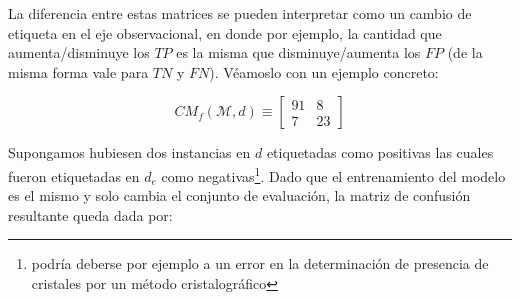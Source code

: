 \iffalse
\[
\begin{array}{ccc}
& & \\
& \text{eje de predicción} &  \\
&
   \begin{bmatrix}
    \lambda_{N,N} (n-n\pi_{P})  + \epsilon_{N,N} & (1-\lambda_{N,N}) (n-n\pi_{P}) + \epsilon_{N,P} \\
    (1-\lambda_{P,P}) n\pi_{P} + \epsilon_{P,N} & \lambda_{P,P} n\pi_{P} + \epsilon_{P,P}
    \end{bmatrix}
    
& \text{eje observacional}
\end{array}
\]
\fi

\iffalse
\[
\begin{array}{ccc}
& & \\
& \text{eje de predicción} &  \\
&
   \begin{bmatrix}
    \lambda_{N,N} (n-n\pi_{P})  + \epsilon_{N,N} & (1-\lambda_{N,N}) (n-n\pi_{P}) + \epsilon_{N,P} \\
    (1-\lambda_{P,P}) n\pi_{P} + \epsilon_{P,N} & \lambda_{P,P} n\pi_{P} + \epsilon_{P,P}
    \end{bmatrix}
    
& \text{eje observacional}
\end{array}
\]
con:
\begin{gather*}
\epsilon_{N,P} + \epsilon_{P,P} = 0 \\
\epsilon_{N,N} + \epsilon_{P,N} = 0
\end{gather*}
\fi

La diferencia entre estas matrices se pueden interpretar como un cambio de etiqueta en el eje observacional, en donde por ejemplo, la cantidad que aumenta/disminuye los $TP$ es la misma que disminuye/aumenta los $FP$ (de la misma forma vale para $TN$ y $FN$). Véamoslo con un ejemplo concreto:

\[
CM_f(\mathcal{M}, d) \equiv 
\begin{bmatrix}
91 & 8\\
7 & 23
\end{bmatrix}
\]

Supongamos hubiesen dos instancias en $d$ etiquetadas como positivas las cuales fueron etiquetadas en $d_{e}$ como negativas\footnote{podría deberse por ejemplo a un error en la determinación de presencia de cristales por un método cristalográfico }. Dado que el entrenamiento del modelo es el mismo y solo cambia el conjunto de evaluación, la matriz de confusión resultante queda dada por:

